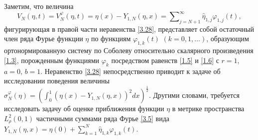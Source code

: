 Заметим,  что величина
\begin{equation}\label{3.30}
 V_N(\eta,t)=V_N^\varphi(\eta,t)=\eta(x)- Y_{1,N}(\eta,x)
=\sum\nolimits_{j=N+1}^\infty \hat \eta_{1,j}\varphi_{1,j}(t),
\end{equation}
  фигурирующая в правой части неравенства \eqref{3.28}, представляет собой остаточный член ряда Фурье функции $\eta$ по функциям $\varphi_{1,k}(t)$ $(k=0,1,\ldots)$, образующим ортонормированную систему по Соболеву относительно скалярного произведения \eqref{1.3}, порожденным  функциями $\varphi_k$ посредством равенств \eqref{1.5} и \eqref{1.6} с $r=1$, $a=0$, $b=1$.  Неравенство \eqref{3.28} непосредственно приводит к  задаче об исследовании поведения величины $\sigma_N^\varphi(\eta)=(\int_{0}^1(\eta(x)- Y_{1,N}(\eta,x))^2 dx)^\frac12$.
Другими словами, требуется исследовать задачу об оценке приближения функции $\eta$ в метрике пространства $L^2_{\rho}(0,1)$ частичными суммами   ряда Фурье \eqref{3.5} вида $Y_{1,N}(\eta,x)= \eta(0)+ \sum\nolimits_{k=1}^N \hat \eta_{1,k}\varphi_{1,k}(t).$













